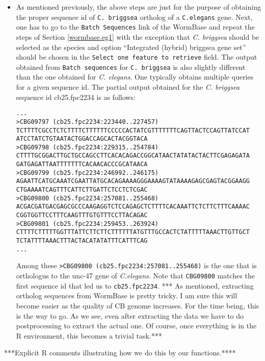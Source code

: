 \documentclass[notitlepage,11pt]{article}
\begin{document}
\begin{itemize}
\item As mentioned previously, the above steps are just for the purpose of obtaining the
  proper sequence id of \texttt{C. briggsea} ortholog of a \texttt{C.elegans}
  gene.  Next, one has to go to the \texttt{Batch Sequences} link of
  the WormBase and repeat the steps of Section \ref{wormbase.eg1}  with
  the exception that \textit{C. briggsea} should be selected as the species 
and 
  option ``Integrated (hybrid) briggsea gene set''
  should be chosen  in the \texttt{Select one feature to retrieve}
  field. The output obtained from \texttt{Batch sequences} for
  \texttt{C. briggsea} is also slightly different than the one obtained for \textit{C. elegans}. One typically
  obtains multiple queries for a given sequence id. The partial output obtained for 
  the \textit{C. briggsea} sequence id cb25.fpc2234 is as follows:
\begin{verbatim}
...
>CBG09797 (cb25.fpc2234:223440..227457)
TCTTTTCGCCTCTCTTTTCTTTTTTCCCCCACTATCGTTTTTTTCAGTTACTCCAGTTATCCAT
ATCCTATCTGTAATACTGGACCAGCACTACGGTACA
>CBG09798 (cb25.fpc2234:229315..254784)
CTTTTGCGGACTTGCTGCCAGCCTTCACACAGACCGGCATAACTATATACTACTTCGAGAGATA
GATGAGATTAATTTTTTTCACAACACCCGCATAACA
>CBG09799 (cb25.fpc2234:246992..246175)
AGAATTCATGCAAATCGAATTATGCACAGAAAAGGGAAAAGTATAAAAGAGCGAGTACGGAAGG
CTGAAAATCAGTTTCATTCTTGATTCTCCTCTCGAC
>CBG09800 (cb25.fpc2234:257081..255468)
ACGACGATGACGAGCGCCCAAGAGGTCTCCAGAGCTCTTTTCACAAATTCTCTTCTTTCAAAAC
CGGTGGTTCCTTTCAAGTTTGTGTTTCCTTACAGAC
>CBG09801 (cb25.fpc2234:259453..263924)
CTTTTCTTTTTGGTTTATTCTTCTTCTTTTTTATGTTTGCCACTCTATTTTTAAACTTGTTGCT
TCTATTTTAAACTTTACTACATATATTTCATTTCAG
...
\end{verbatim}
Among these \texttt{>CBG09800 (cb25.fpc2234:257081..255468)} is the one that is orthologus to the unc-47 gene 
of \textit{C.elegans}. 
Note that \texttt{CBG09800} matches the first sequence id that led us to \texttt{cb25.fpc2234}.
*** As mentioned, extracting ortholog sequences from WormBase is pretty tricky. I am sure this will become easier as the 
quality of CB genome increases. For the time being, this is the way to go. As we see, even after extracting the data we have 
to do postprocessing to extract the actual one. Of course, once everything is in the R environment, 
this becomes a trivial task.***



\end{itemize}

***Explicit R comments illustrating how we do this by our functions.****
\end{document}
